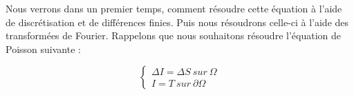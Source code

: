 Nous verrons dans un premier temps, comment résoudre cette équation à l'aide de discrétisation et de différences finies. Puis nous résoudrons celle-ci à l'aide des transformées de Fourier. 
Rappelons que nous souhaitons résoudre l'équation de Poisson suivante : 
\begin{center}

\begin{equation*}
    \left \{
    \begin{aligned}
    \Delta I = \Delta S \ sur \ \Omega\\
    I = T \ sur \ \partial \Omega
    \end{aligned}
    \right.
\end{equation*}
\end{center}
